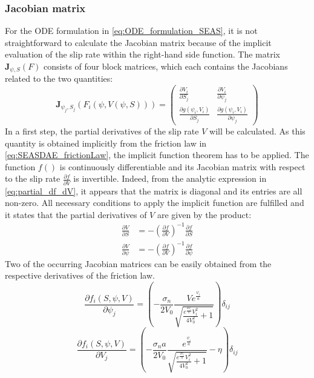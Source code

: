 \subsubsection{Jacobian matrix}
\label{sssec:Jacobian_ODE}
For the ODE formulation in \autoref{eq:ODE_formulation_SEAS}, it is not straightforward to calculate the Jacobian matrix because of the implicit evaluation of the slip rate within the right-hand side function. The matrix $\mathbf{J}_{\psi,S}(F)$ consists of four block matrices, which each contains the Jacobians related to the two quantities:
\begin{equation}
\label{eq:Jacobian_ODE_formulation}
\mathbf{J}_{\psi_j,S_j}\left(F_i\left(\psi,V(\psi,S)\right)\right) = \begin{pmatrix} 
\frac{\partial V_i}{\partial S_j} &
\frac{\partial V_i}{\partial \psi_j} \\ 
\frac{\partial g(\psi_i,V_i)}{\partial S_j} &
\frac{\partial g(\psi_i,V_i)}{\partial \psi_j}  \end{pmatrix}
\end{equation}
In a first step, the partial derivatives of the slip rate $V$ will be calculated. As this quantity is obtained implicitly from the friction law in \autoref{eq:SEASDAE_frictionLaw}, the implicit function theorem has to be applied. The function $f()$ is continuously differentiable and its Jacobian matrix with respect to the slip rate $\frac{\partial f}{\partial V}$ is invertible. Indeed, from the analytic expression in \autoref{eq:partial_df_dV}, it appears that the matrix is diagonal and its entries are all non-zero. All necessary conditions to apply the implicit function are fulfilled and it states that the partial derivatives of $V$ are given by the product:
\begin{align}
\frac{\partial V}{\partial S} &= -\left(\frac{\partial f}{\partial V}\right)^{-1}\frac{\partial f}{\partial S} \\ 
\frac{\partial V}{\partial \psi} &= -\left(\frac{\partial f}{\partial V}\right)^{-1}\frac{\partial f}{\partial \psi} 
\end{align}
Two of the occurring Jacobian matrices can be easily obtained from the respective derivatives of the friction law. 
\begin{equation}
\frac{\partial f_i(S,\psi,V)}{\partial \psi_j} = \left( -\frac{\sigma_n}{2V_0} \frac{Ve^{\frac{\psi_i}{a}}}{\sqrt{\frac{e^{\frac{2\psi_i}{a}}V_i^2}{4V_0^2}+1}}\right)\delta_{ij} 
\label{eq:partial_df_dpsi}
\end{equation}	
\begin{equation}
\frac{\partial f_i(S,\psi,V)}{\partial V_j} = \left( -\frac{\sigma_na}{2V_0} \frac{e^{\frac{\psi_i}{a}}}{\sqrt{\frac{e^{\frac{2\psi_i}{a}}V_i^2}{4V_0^2}+1}}-\eta\right)\delta_{ij} 
\label{eq:partial_df_dV}
\end{equation}
